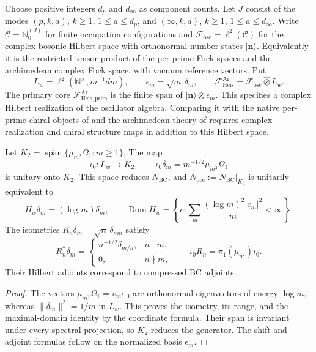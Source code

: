 \begin{definition}
\label{v4-arith:w5-b:def:fock}
Choose positive integers $d_p$ and $d_\infty$ as component counts.
Let $J$ consist of the modes $(p,k,a)$, $k\geq1$, $1\leq a\leq d_p$,
and $(\infty,k,a)$, $k\geq1$, $1\leq a\leq d_\infty$.
Write $\mathcal C=\mathbb N_0^{(J)}$ for finite occupation configurations
and $\mathcal F_{\mathrm{osc}}=\ell^2(\mathcal C)$ for the complex
bosonic Hilbert space with orthonormal number states $|\mathbf n\rangle$.
Equivalently it is the restricted tensor product of the per-prime
Fock spaces and the archimedean complex Fock space, with vacuum
reference vectors. Put
\[
 L_w=\ell^2(\mathbb N^\times,m^{-1}dm),\qquad
 \epsilon_m=\sqrt m\,\delta_m,\qquad
 \mathcal F^{\mathrm{Ar}}_{\mathrm{Heis}}
   =\mathcal F_{\mathrm{osc}}\widehat\otimes L_w.
\]
The primary core $\mathcal F^{\mathrm{Ar}}_{\mathrm{Heis},\mathrm{prim}}$
is the finite span of $|\mathbf n\rangle\otimes\epsilon_m$.
This specifies a complex Hilbert realization of the oscillator
algebra. Comparing it with the native per-prime chiral objects of
 and the archimedean theory of
 requires complex realization and chiral
structure maps in addition to this Hilbert space.
\end{definition}

\begin{lemma}
\label{v4-arith:w5-b:lem:zero-mode-embeds-gns}
Let $K_2=\overline{\operatorname{span}}\{\mu_{m^2}\Omega_1:m\geq1\}$.
The map
\[
 \iota_0:L_w\longrightarrow K_2,\qquad
 \iota_0\delta_m=m^{-1/2}\mu_{m^2}\Omega_1
\]
is unitary onto $K_2$. This space reduces $N_{\mathrm{BC}}$, and
$N_{\mathrm{occ}}:=N_{\mathrm{BC}}|_{K_2}$ is unitarily equivalent to
\[
 H_w\delta_m=(\log m)\delta_m,\qquad
 \operatorname{Dom}H_w
 =\left\{c:\sum_m\frac{(\log m)^2|c_m|^2}{m}<\infty\right\}.
\]
The isometries $R_n\delta_m=\sqrt n\,\delta_{nm}$ satisfy
\[
 R_n^*\delta_m=
 \begin{cases}n^{-1/2}\delta_{m/n},&n\mid m,\\0,&n\nmid m,\end{cases}
 \qquad \iota_0R_n=\pi_1(\mu_{n^2})\iota_0.
\]
Their Hilbert adjoints correspond to compressed BC adjoints.
\end{lemma}
\begin{proof}
The vectors $\mu_{m^2}\Omega_1=v_{m^2,0}$ are orthonormal eigenvectors
of energy $\log m$, whereas $\|\delta_m\|^2=1/m$ in $L_w$.
This proves the isometry, its range, and the maximal-domain identity
by the coordinate formula. Their span is invariant under every
spectral projection, so $K_2$ reduces the generator. The shift and
adjoint formulas follow on the normalized basis $\epsilon_m$.
\end{proof}

